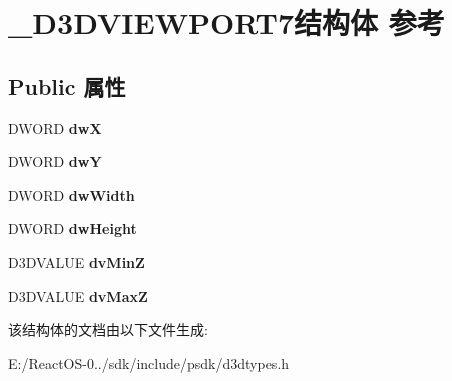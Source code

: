 \hypertarget{struct___d3_d_v_i_e_w_p_o_r_t7}{}\section{\+\_\+\+D3\+D\+V\+I\+E\+W\+P\+O\+R\+T7结构体 参考}
\label{struct___d3_d_v_i_e_w_p_o_r_t7}
\subsection*{Public 属性}
\begin{DoxyCompactItemize}
\item 
\mbox{\label{struct___d3_d_v_i_e_w_p_o_r_t7_af0a0f9d2f7d5ce62ed0fc8000dbb6d65}} 
D\+W\+O\+RD {\bfseries dwX}
\item 
\mbox{\label{struct___d3_d_v_i_e_w_p_o_r_t7_acd21e21e7f75959cf1c5c8d3d3a4f757}} 
D\+W\+O\+RD {\bfseries dwY}
\item 
\mbox{\label{struct___d3_d_v_i_e_w_p_o_r_t7_a23821618a76213e27136aed9ea051064}} 
D\+W\+O\+RD {\bfseries dw\+Width}
\item 
\mbox{\label{struct___d3_d_v_i_e_w_p_o_r_t7_aad17bd0005695cbb059a46a6c76f7ee2}} 
D\+W\+O\+RD {\bfseries dw\+Height}
\item 
\mbox{\label{struct___d3_d_v_i_e_w_p_o_r_t7_a1ec4d9d8b610d3c2b34ab88941f7016d}} 
D3\+D\+V\+A\+L\+UE {\bfseries dv\+MinZ}
\item 
\mbox{\label{struct___d3_d_v_i_e_w_p_o_r_t7_a44a85316a48c6a6652ab0dbcba7cc08f}} 
D3\+D\+V\+A\+L\+UE {\bfseries dv\+MaxZ}
\end{DoxyCompactItemize}


该结构体的文档由以下文件生成\+:\begin{DoxyCompactItemize}
\item 
E\+:/\+React\+O\+S-\/0../sdk/include/psdk/d3dtypes.\+h\end{DoxyCompactItemize}
